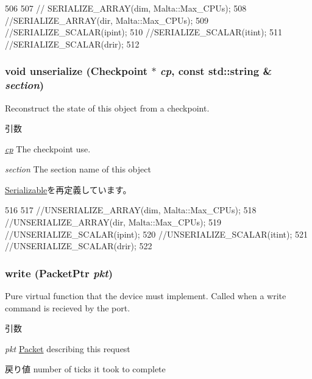 \begin{DoxyCode}
506 {
507    // SERIALIZE_ARRAY(dim, Malta::Max_CPUs);
508     //SERIALIZE_ARRAY(dir, Malta::Max_CPUs);
509     //SERIALIZE_SCALAR(ipint);
510     //SERIALIZE_SCALAR(itint);
511     //SERIALIZE_SCALAR(drir);
512 }
\end{DoxyCode}
\hypertarget{classMaltaCChip_af22e5d6d660b97db37003ac61ac4ee49}{
\subsubsection[{unserialize}]{\setlength{\rightskip}{0pt plus 5cm}void unserialize ({\bf Checkpoint} $\ast$ {\em cp}, \/  const std::string \& {\em section})}}
\label{classMaltaCChip_af22e5d6d660b97db37003ac61ac4ee49}
Reconstruct the state of this object from a checkpoint. 
\begin{DoxyParams}{引数}
\item[{\em \hyperlink{namespacecp}{cp}}]The checkpoint use. \item[{\em section}]The section name of this object \end{DoxyParams}


\hyperlink{classSerializable_af100c4e9feabf3cd918619c88c718387}{Serializable}を再定義しています。


\begin{DoxyCode}
516 {
517     //UNSERIALIZE_ARRAY(dim, Malta::Max_CPUs);
518     //UNSERIALIZE_ARRAY(dir, Malta::Max_CPUs);
519     //UNSERIALIZE_SCALAR(ipint);
520     //UNSERIALIZE_SCALAR(itint);
521     //UNSERIALIZE_SCALAR(drir);
522 }
\end{DoxyCode}
\hypertarget{classMaltaCChip_a4cefab464e72b5dd42c003a0a4341802}{
\subsubsection[{write}]{ write ({\bf PacketPtr} {\em pkt})}}
\label{classMaltaCChip_a4cefab464e72b5dd42c003a0a4341802}
Pure virtual function that the device must implement. Called when a write command is recieved by the port. 
\begin{DoxyParams}{引数}
\item[{\em pkt}]\hyperlink{classPacket}{Packet} describing this request \end{DoxyParams}
\begin{DoxyReturn}{戻り値}
number of ticks it took to complete 
\end{DoxyReturn}


